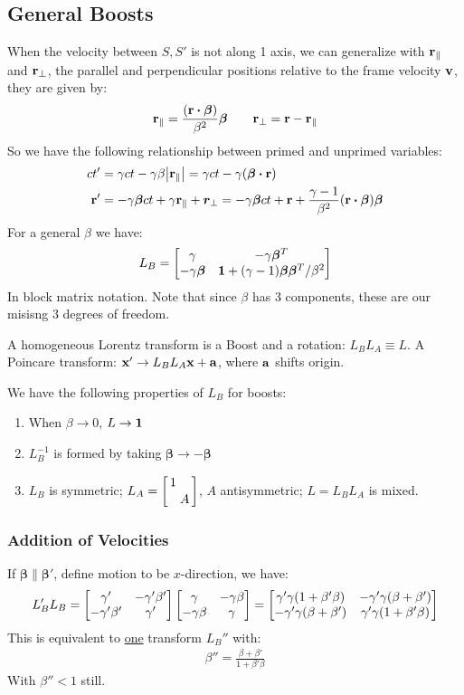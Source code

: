 \subsection{General Boosts}
When the velocity between $S,S'$ is not along 1 axis, we can generalize with $\vb{r}_\|$ and $\vb{r}_\perp$, the parallel and perpendicular positions relative to the frame velocity $\vb{v}$, they are given by:
\begin{align*}
  \vb{r}_\|=\frac{(\vb{r}\vdot\bm{\beta})}{\beta^2}\bm{\beta}
  \qquad
  \vb{r}_\perp=\vb{r}-\vb{r}_\|
\end{align*}
So we have the following relationship between primed and unprimed variables:
\begin{align*}
  ct'&=\gamma ct-\gamma\beta\abs{\vb{r}_\|}=
  \gamma ct-\gamma(\vb{\bm{\beta}\vdot\vb{r}})\\
  \vb{r}'&=-\gamma\bm{\beta}ct+\gamma\vb{r}_\|+\bm{r}_\perp
  =-\gamma\bm{\beta}ct+\vb{r}+
  \frac{\gamma-1}{\beta^2}(\vb{r}\vdot\bm{\beta})\bm{\beta}  
\end{align*}
For a general $\beta$ we have:
\begin{align*}
  L_B=\bmqty{\gamma&-\gamma\bm{\beta}^T\\-\gamma\bm{\beta}
    &\id+(\gamma-1)\bm{\beta\beta}^T/\beta^2}
\end{align*}
In block matrix notation. Note that since $\beta$ has 3 components, these are our misisng 3 degrees of freedom.

A homogeneous Lorentz transform is a Boost and a rotation: $L_B L_A\equiv L$. A Poincare transform: $\vb{x}'\to L_BL_A\vb{x}+\vb{a}$, where $\vb{a}$ shifts origin.
\begin{note}
  We have the following properties of $L_B$ for boosts:
  \begin{enumerate}
  \item When $\beta\to0$, $L\to\bm{1}$
  \item $L_B^{-1}$ is formed by taking $\bm{\beta}\to-\bm{\beta}$
  \item $L_B$ is symmetric; $L_A=\smqty[\dmat{1,A}]$, $A$ antisymmetric; $L=L_BL_A$ is mixed.
  \end{enumerate}
\end{note}
\subsubsection{Addition of Velocities}
If $\bm{\beta}\|\bm{\beta}'$, define motion to be $x$-direction, we have:
\begin{align*}
  L'_BL_B=\bmqty{\gamma'&-\gamma'\beta'\\-\gamma'\beta'&\gamma'}
  \bmqty{\gamma&-\gamma\beta\\-\gamma\beta&\gamma}=
  \bmqty{\gamma'\gamma(1+\beta'\beta)&-\gamma'\gamma(\beta+\beta')\\
    -\gamma'\gamma(\beta+\beta')&\gamma'\gamma(1+\beta'\beta)}
\end{align*}
This is equivalent to \underline{one} transform $L_B''$ with:
\begin{align*}
  \beta''=\frac{\beta+\beta'}{1+\beta'\beta}
\end{align*}
With $\beta''<1$ still.

